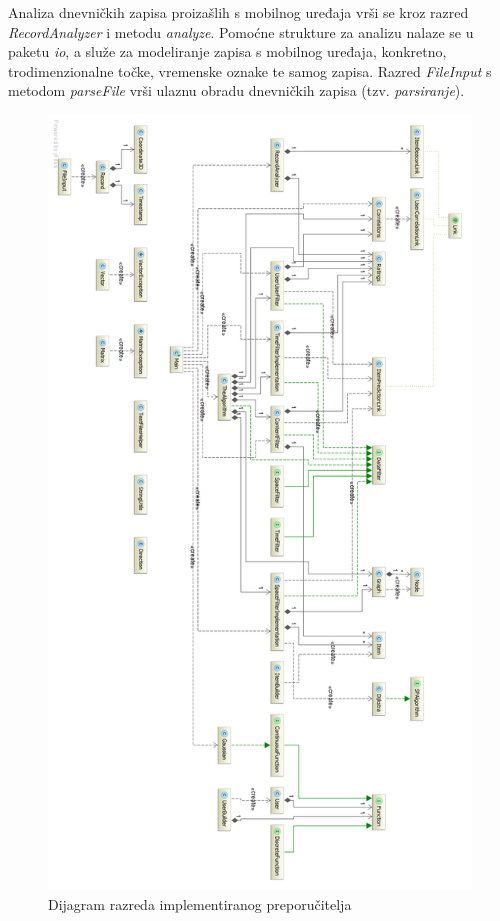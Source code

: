 \documentclass[times, utf8, diplomski, numeric]{fer}
\begin{document}
Analiza dnevničkih zapisa proizašlih s mobilnog uređaja vrši se kroz razred
\emph{RecordAnalyzer} i metodu \emph{analyze}. Pomoćne strukture za analizu
nalaze se u paketu \emph{io}, a služe za modeliranje zapisa s mobilnog uređaja,
konkretno, trodimenzionalne točke, vremenske oznake te samog zapisa. Razred
\emph{FileInput} s metodom \emph{parseFile} vrši ulaznu obradu dnevničkih
zapisa (tzv. \emph{parsiranje}).

\begin{figure}[H]
	\centering
	\includegraphics[width=14cm]{images/diagramland.png}
	\caption{Dijagram razreda implementiranog preporučitelja}
	\label{fig:classdiagram}
\end{figure}
\end{document}
